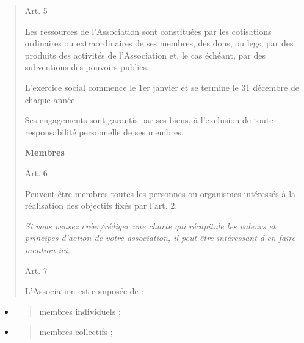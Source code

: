 \documentclass[
]{article}
\begin{document}
\begin{quote}
Art. 5

Les ressources de l'Association sont constituées par les cotisations
ordinaires ou extraordinaires de ses membres, des dons, ou legs, par des
produits des activités de l'Association et, le cas échéant, par des
subventions des pouvoirs publics.

L'exercice social commence le 1er janvier et se termine le 31 décembre
de chaque année.

Ses engagements sont garantis par ses biens, à l'exclusion de toute
responsabilité personnelle de ses membres.

\textbf{Membres}

Art. 6

Peuvent être membres toutes les personnes ou organismes intéressés à la
réalisation des objectifs fixés par l'art. 2.

\emph{Si vous pensez créer/rédiger une charte qui récapitule les valeurs
et principes d'action de votre association, il peut être intéressant
d'en faire mention ici.}

Art. 7

L'Association est composée de :
\end{quote}

\begin{itemize}
\item
  \begin{quote}
  membres individuels ;
  \end{quote}
\item
  \begin{quote}
  membres collectifs ;
  \end{quote}
\end{itemize}
\end{document}
